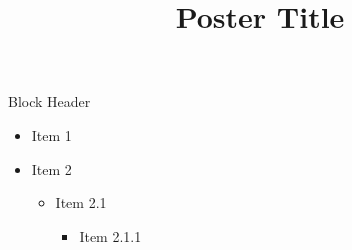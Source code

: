 \documentclass{tugPoster}
\title{Poster Title}
\begin{document}
	\maketitle

	\begin{IPTtwocol}
		\begin{IPTblock}{Block Header}
			\begin{itemize}
				\item Item 1
				\item Item 2
				\begin{itemize}
					\item Item 2.1
					\begin{itemize}
						\item Item 2.1.1
					\end{itemize}
				\end{itemize}
			\end{itemize}
		\end{IPTblock}
	\end{IPTtwocol}
\end{document}
